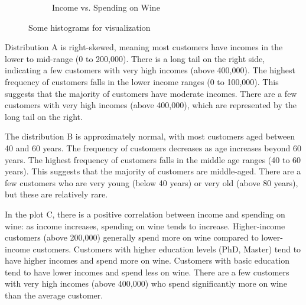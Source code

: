 \documentclass[a4paper]{article}
\begin{document}
\begin{figure}[h]
\begin{subfigure}{0.3\textwidth}
        \caption{Income vs. Spending on Wine}
        \label{fig:sub3}
    \end{subfigure}
    \caption{Some histograms for visualization}
    \label{fig:multi}
\end{figure}


\begin{multicols}{2} 

Distribution A is right-skewed, meaning most customers have incomes in the lower to mid-range (0 to 200,000).
There is a long tail on the right side, indicating a few customers with very high incomes (above 400,000).
The highest frequency of customers falls in the lower income ranges (0 to 100,000).
This suggests that the majority of customers have moderate incomes.
There are a few customers with very high incomes (above 400,000), which are represented by the long tail on the right.


The distribution B is approximately normal, with most customers aged between 40 and 60 years.
The frequency of customers decreases as age increases beyond 60 years.
The highest frequency of customers falls in the middle age ranges (40 to 60 years).
This suggests that the majority of customers are middle-aged.
There are a few customers who are very young (below 40 years) or very old (above 80 years), but these are relatively rare.


In the plot C, there is a positive correlation between income and spending on wine: as income increases, spending on wine tends to increase.
Higher-income customers (above 200,000) generally spend more on wine compared to lower-income customers.
Customers with higher education levels (PhD, Master) tend to have higher incomes and spend more on wine.
Customers with basic education tend to have lower incomes and spend less on wine.
There are a few customers with very high incomes (above 400,000) who spend significantly more on wine than the average customer.


\end{multicols}
\end{document}
